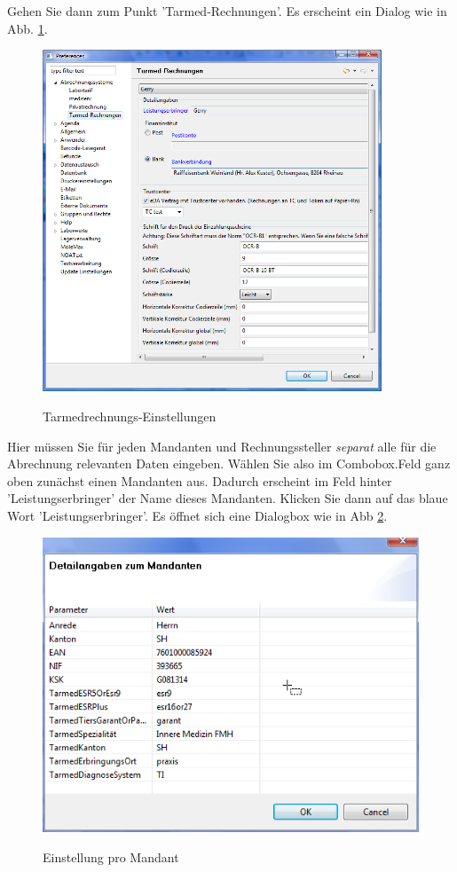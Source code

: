 \documentclass[a4paper]{scrartcl}
\begin{document}
\medskip

Gehen Sie dann zum Punkt 'Tarmed-Rechnungen'. Es erscheint ein Dialog wie in Abb. \ref{fig:abr4}.
\begin{figure}
  \includegraphics[width=0.9\textwidth]{abr4}\\
  \caption{Tarmedrechnungs-Einstellungen}\label{fig:abr4}
\end{figure}

Hier müssen Sie für jeden Mandanten und Rechnungssteller \textit{separat} alle für die Abrechnung relevanten Daten eingeben. Wählen Sie also im Combobox.Feld ganz oben zunächst einen Mandanten aus. Dadurch erscheint im Feld hinter 'Leistungserbringer' der Name dieses Mandanten. Klicken Sie dann auf das blaue Wort 'Leistungserbringer'. Es öffnet sich eine Dialogbox wie in Abb \ref{fig:abr5}.
\begin{figure}
  \includegraphics{abr5}\\
  \caption{Einstellung pro Mandant}\label{fig:abr5}
\end{figure}
\end{document}
